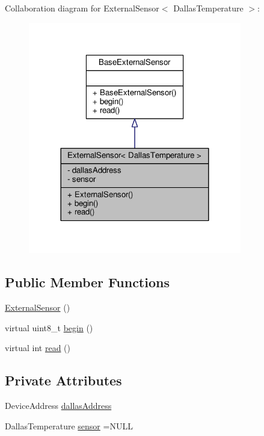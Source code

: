 Collaboration diagram for External\+Sensor$<$ Dallas\+Temperature $>$\+:
\nopagebreak
\begin{figure}[H]
\begin{center}
\leavevmode
\includegraphics[width=264pt]{classExternalSensor_3_01DallasTemperature_01_4__coll__graph}
\end{center}
\end{figure}
\subsection*{Public Member Functions}
\begin{DoxyCompactItemize}
\item 
\hyperlink{classExternalSensor_3_01DallasTemperature_01_4_ad290681e8780cdf1870416eee99d699d}{External\+Sensor} ()
\item 
virtual uint8\+\_\+t \hyperlink{classExternalSensor_3_01DallasTemperature_01_4_ac5275129b05e2ff8df45d5b222a661d9}{begin} ()
\item 
virtual int \hyperlink{classExternalSensor_3_01DallasTemperature_01_4_a127ead06440ec972c22db2abeb8e2b51}{read} ()
\end{DoxyCompactItemize}
\subsection*{Private Attributes}
\begin{DoxyCompactItemize}
\item 
Device\+Address \hyperlink{classExternalSensor_3_01DallasTemperature_01_4_a7d9e9d2893e453638fcf440e5d8d9082}{dallas\+Address}
\item 
Dallas\+Temperature \hyperlink{classExternalSensor_3_01DallasTemperature_01_4_adb6ba4fcdedef95ad8f6b0c9b6c0f9d1}{sensor} =N\+U\+LL
\end{DoxyCompactItemize}


